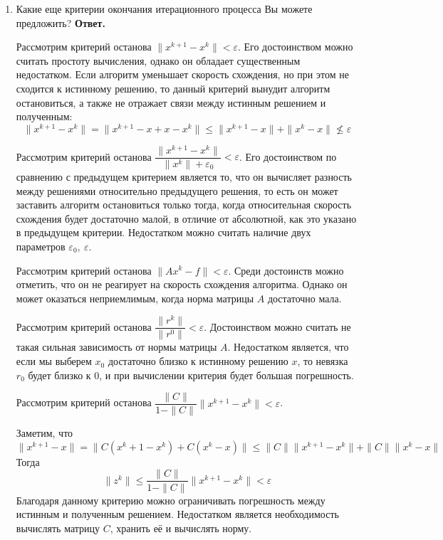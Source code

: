 \documentclass{article}
\begin{document}
\begin{enumerate}
        
        \item Какие еще критерии окончания итерационного процесса
        Вы можете предложить?
        \newline
        {\bfseries Ответ.}

        Рассмотрим критерий останова $\|x^{k+1} - x^k\| < \varepsilon$. Его достоинством
        можно считать простоту вычисления, однако он обладает существенным недостатком. Если 
        алгоритм уменьшает скорость схождения, но при этом не сходится к истинному решению, то данный 
        критерий вынудит алгоритм остановиться, а также не отражает связи между истинным решением и полученным: 
        \begin{equation*}
            \|x^{k+1} - x^k \| = \|x^{k+1} - x + x - x^k\| \leqslant \|x^{k+1} - x\| + \|x^k - x\| \not \leqslant \varepsilon   
        \end{equation*}

        Рассмотрим критерий останова 
        $\dfrac{\|x^{k+1} - x^k\| }{\|x^k\|+ \varepsilon_0} < \varepsilon$.
        Его достоинством по сравнению с предыдущем критерием является то, что 
        он вычисляет разность между решениями относительно предыдущего решения, то есть 
        он может заставить алгоритм остановиться только тогда, когда относительная скорость 
        схождения будет достаточно малой, в отличие от абсолютной, как это указано в предыдущем критерии.
        Недостатком можно считать наличие двух параметров $\varepsilon_0, \ \varepsilon$.

        Рассмотрим критерий останова $\|Ax^k - f \|< \varepsilon$. Среди достоинств можно отметить, что 
        он не реагирует на скорость схождения алгоритма. Однако он может оказаться неприемлимым, когда 
        норма матрицы $A$ достаточно мала.   

        Рассмотрим критерий останова $\dfrac{\|r^k\|}{\|r^0\|} < \varepsilon$. Достоинством можно считать 
        не такая сильная зависимость от нормы матрицы $A$. Недостатком является, что если мы выберем $x_0$ 
        достаточно близко к истинному решению $x$, то невязка $r_0$ будет близко к 
        0, и при вычислении критерия будет большая погрешность. 

        Рассмотрим критерий останова $\dfrac{\|C\|}{1-\|C\|} \|x^{k+1} - x^k\| < \varepsilon$.
        
        Заметим, что 
        \begin{equation*}
            \|x^{k+1} - x\| = \|C(x^k+1 - x^k) + C(x^k - x)\| \leqslant
            \|C\| \|x^{k+1} - x^k\| + \| C\| \|x^k - x\|
        \end{equation*}
        Тогда
        \begin{equation*}
            \|z^k\| \leqslant \dfrac{\|C\|}{1-\|C\|} \|x^{k+1} - x^k\| < \varepsilon
        \end{equation*}
        Благодаря данному критерию можно ограничивать погрешность между истинным и полученным решением. 
        Недостатком является необходимость вычислять матрицу $C$, хранить её и вычислять норму. 


    \end{enumerate}
\end{document}
